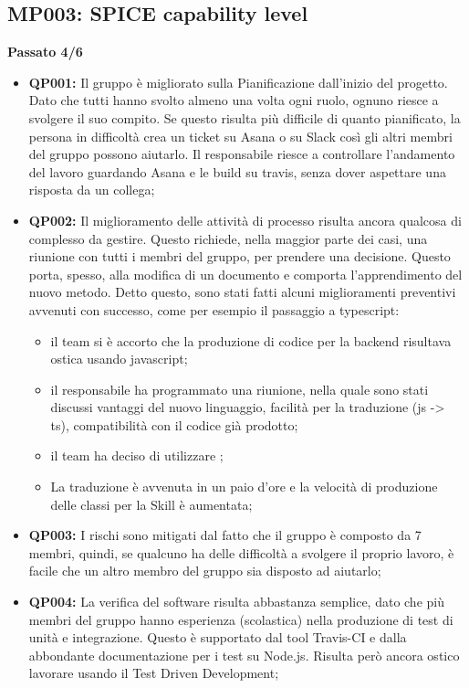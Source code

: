 \subsection{MP003: SPICE capability level}
\textbf{Passato 4/6}
\begin{itemize}
	\item \textbf{QP001:} Il gruppo è migliorato sulla Pianificazione dall'inizio del progetto. Dato che tutti hanno svolto almeno una volta ogni ruolo, ognuno riesce a svolgere il suo compito. Se questo risulta più difficile di quanto pianificato, la persona in difficoltà crea un ticket su Asana o su Slack così gli altri membri del gruppo possono aiutarlo. Il responsabile riesce a controllare l'andamento del lavoro guardando Asana e le build su travis, senza dover aspettare una risposta da un collega;
	\item \textbf{QP002:} Il miglioramento delle attività di processo risulta ancora qualcosa di complesso da gestire. Questo richiede, nella maggior parte dei casi, una riunione con tutti i membri del gruppo, per prendere una decisione. Questo porta, spesso, alla modifica di un documento e comporta l'apprendimento del nuovo metodo. Detto questo, sono stati fatti alcuni miglioramenti preventivi avvenuti con successo, come per esempio il passaggio a typescript:
		\begin{itemize}
			\item il team si è accorto che la produzione di codice per la backend risultava ostica usando javascript;
			\item il responsabile ha programmato una riunione, nella quale sono stati discussi vantaggi del nuovo linguaggio, facilità per la traduzione (js -> ts), compatibilità con il codice già prodotto;
			\item il team ha deciso di utilizzare ; 
			\item La traduzione è avvenuta in un paio d'ore e la velocità di produzione delle classi per la Skill è aumentata;
		\end{itemize} 
	\item \textbf{QP003:} I rischi sono mitigati dal fatto che il gruppo è composto da 7 membri, quindi, se qualcuno ha delle difficoltà a svolgere il proprio lavoro, è facile che un altro membro del gruppo sia disposto ad aiutarlo;
	\item \textbf{QP004:} La verifica del software risulta abbastanza semplice, dato che più membri del gruppo hanno esperienza (scolastica) nella produzione di test di unità e integrazione. Questo è supportato dal tool Travis-CI e dalla abbondante documentazione per i test su Node.js. Risulta però ancora ostico lavorare usando il Test Driven Development;

\end{itemize}
